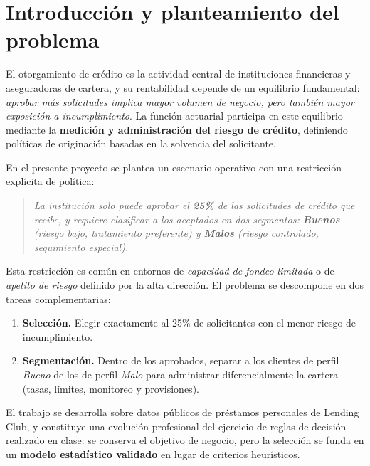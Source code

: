 \documentclass[11pt,letterpaper]{article}
\begin{document}
\section{Introducción y planteamiento del problema}

El otorgamiento de crédito es la actividad central de instituciones financieras
y aseguradoras de cartera, y su rentabilidad depende de un equilibrio
fundamental: \emph{aprobar más solicitudes implica mayor volumen de negocio,
pero también mayor exposición a incumplimiento}. La función actuarial participa
en este equilibrio mediante la \textbf{medición y administración del riesgo de
crédito}, definiendo políticas de originación basadas en la solvencia del
solicitante.

En el presente proyecto se plantea un escenario operativo con una restricción
explícita de política:

\begin{quote}
\textit{La institución solo puede aprobar el \textbf{25\%} de las solicitudes
de crédito que recibe, y requiere clasificar a los aceptados en dos segmentos:
\textbf{Buenos} (riesgo bajo, tratamiento preferente) y \textbf{Malos} (riesgo
controlado, seguimiento especial).}
\end{quote}

Esta restricción es común en entornos de \emph{capacidad de fondeo limitada} o
de \emph{apetito de riesgo} definido por la alta dirección. El problema se
descompone en dos tareas complementarias:

\begin{enumerate}[label=\textbf{T\arabic*.},leftmargin=1.6em]
  \item \textbf{Selección.} Elegir exactamente al 25\% de solicitantes con el
        menor riesgo de incumplimiento.
  \item \textbf{Segmentación.} Dentro de los aprobados, separar a los clientes
        de perfil \emph{Bueno} de los de perfil \emph{Malo} para administrar
        diferencialmente la cartera (tasas, límites, monitoreo y provisiones).
\end{enumerate}

El trabajo se desarrolla sobre datos públicos de préstamos personales de
Lending Club, y constituye una evolución profesional del ejercicio de reglas
de decisión realizado en clase: se conserva el objetivo de negocio, pero la
selección se funda en un \textbf{modelo estadístico validado} en lugar de
criterios heurísticos.
\end{document}
